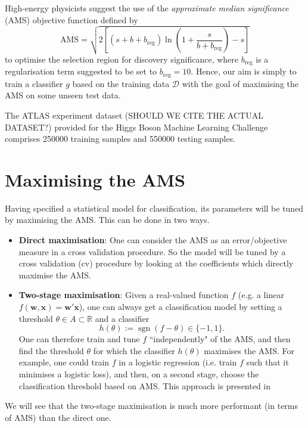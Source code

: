\documentclass[]{article}
\begin{document}
High-energy physicists suggest the use of the \textit{approximate median significance} (AMS) objective function defined by
\begin{equation}
\label{AMS}
	\text{AMS} = \sqrt{2 \left[ (s + b + b_\text{reg}) \ln \left( 1 + \frac{s}{b + b_\text{reg}} \right) - s \right]}
\end{equation}
to optimise the selection region for discovery significance, where $b_\text{reg}$ is a regularisation term suggested to be set to $b_\text{reg}=10$. Hence, our aim is simply to train a classifier $g$ based on the training data $\mathcal{D}$ with the goal of maximising the AMS on some unseen test data.

The ATLAS experiment dataset (SHOULD WE CITE THE ACTUAL DATASET?) provided for the Higgs Boson Machine Learning Challenge comprises 250000 training samples and 550000 testing samples.

\section{Maximising the AMS}

Having specified a statistical model for classification, its parameters will be tuned by maximising the AMS. This can be done in two ways.

\begin{itemize}
\item \textbf{Direct maximisation}: One can consider the AMS as an error/objective measure in a cross validation procedure. So the model will be tuned by a cross validation (cv) procedure by looking at the coefficients which directly maximise the AMS.

\item \textbf{Two-stage maximisation}: Given a real-valued function $f$ (e.g. a linear $f(\bm{w},\bm{x})=\bm{w}'\bm{x}$), one can always get a classification model by setting a threshold $\theta \in A\subset \mathbb{R}$ and a classifier
\begin{equation}
\label{classifier from f}
h(\theta):=\operatorname{sgn}(f-\theta)\in \{-1,1\}.
\end{equation}
One can therefore train and tune $f$ ``independently" of the AMS, and then find the threshold $\theta$ for which the classifier $h(\theta)$ maximises the AMS. For example, one could train $f$ in a logistic regression (i.e. train $f$ such that it minimises a logistic loss), and then, on a second stage, choose the classification threshold based on AMS. This approach is presented in \cite{kotlowski2014consistent}
\end{itemize}
We will see that the two-stage maximisation is much more performant (in terms of AMS) than the direct one.
\end{document}
